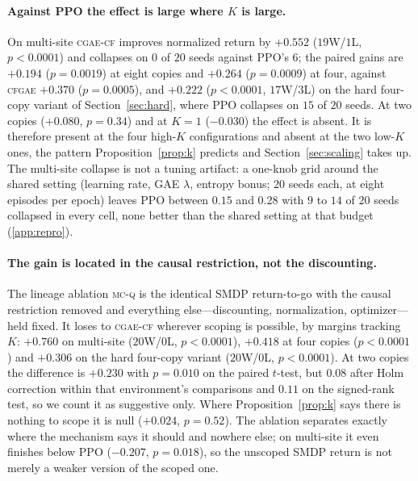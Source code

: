 \documentclass[review,authoryear,3p,times]{elsarticle}
\newcommand{\cflow}{\textsc{cgae-cf}}          %
\newcommand{\mcq}{\textsc{mc-q}}
\newcommand{\cfgae}{\textsc{cfgae}}
\begin{document}
\paragraph{Against PPO the effect is large where $K$ is large.}
On multi-site \cflow{} improves normalized return by $+0.552$ ($19$W/$1$L,
$p<0.0001$) and collapses on $0$ of $20$ seeds against PPO's $6$; the paired
gains are $+0.194$ ($p=0.0019$) at eight copies and $+0.264$ ($p=0.0009$) at
four, against \cfgae{} $+0.370$ ($p=0.0005$), and $+0.222$ ($p<0.0001$,
$17$W/$3$L) on the hard four-copy variant of Section~\ref{sec:hard}, where PPO
collapses on $15$ of $20$ seeds. At two copies ($+0.080$, $p=0.34$)
and at $K{=}1$ ($-0.030$) the effect is absent. It is therefore present at the
four high-$K$ configurations and absent at the two low-$K$ ones, the pattern
Proposition~\ref{prop:k} predicts and Section~\ref{sec:scaling} takes up. The
multi-site collapse is not a tuning artifact: a one-knob grid around the shared
setting (learning rate, GAE $\lambda$, entropy bonus; $20$ seeds each, at
eight episodes per epoch) leaves PPO between $0.15$ and $0.28$ with $9$ to $14$
of $20$ seeds collapsed in every cell, none better than the shared setting at
that budget (\ref{app:repro}).

\paragraph{The gain is located in the causal restriction, not the discounting.}
The lineage ablation \mcq{} is the identical SMDP return-to-go with the causal
restriction removed and everything else---discounting, normalization,
optimizer---held fixed. It loses to \cflow{} wherever scoping is possible, by
margins tracking $K$: $+0.760$ on multi-site ($20$W/$0$L, $p<0.0001$), $+0.418$
at four copies ($p<0.0001$) and $+0.306$ on the hard four-copy variant
($20$W/$0$L, $p<0.0001$). At two copies the difference is $+0.230$ with
$p=0.010$ on the paired $t$-test, but $0.08$ after Holm correction within that
environment's comparisons and $0.11$ on the signed-rank test, so we count it
as suggestive only. Where
Proposition~\ref{prop:k} says there is nothing to scope it is null ($+0.024$,
$p=0.52$). The ablation separates exactly where the mechanism says it should and
nowhere else; on multi-site it even finishes below PPO ($-0.207$, $p=0.018$),
so the unscoped SMDP return is not merely a weaker version of the scoped one.
\end{document}
